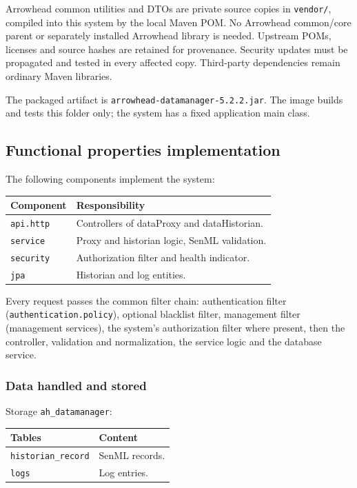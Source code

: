 \documentclass[a4paper]{arrowhead}
\begin{document}
Arrowhead common utilities and DTOs are private source copies in \texttt{vendor/}, compiled into this system by the local Maven POM. No Arrowhead common/core parent or separately installed Arrowhead library is needed. Upstream POMs, licenses and source hashes are retained for provenance. Security updates must be propagated and tested in every affected copy. Third-party dependencies remain ordinary Maven libraries.

The packaged artifact is \texttt{arrowhead-\allowbreak{}datamanager-5.2.2.jar}. The image builds and tests this folder only; the system has a fixed application main class.

\subsection{Functional properties implementation}

The following components implement the system:

\noindent\begin{longtable}{| p{5.6cm} | p{9.6cm} |} \hline
\rowcolor{gray!33} Component & Responsibility \\ \hline \endhead
\texttt{api.\allowbreak{}http} & Controllers of dataProxy and dataHistorian. \\ \hline
\texttt{service} & Proxy and historian logic, SenML validation. \\ \hline
\texttt{security} & Authorization filter and health indicator. \\ \hline
\texttt{jpa} & Historian and log entities. \\ \hline
\end{longtable}

Every request passes the common filter chain: authentication filter (\texttt{authentication.\allowbreak{}policy}), optional blacklist filter, management filter (management services), the system's authorization filter where present, then the controller, validation and normalization, the service logic and the database service.

\subsubsection{Data handled and stored}

Storage \texttt{ah\_\allowbreak{}datamanager}:

\noindent\begin{longtable}{| p{6.4cm} | p{8.8cm} |} \hline
\rowcolor{gray!33} Tables & Content \\ \hline \endhead
\texttt{historian\_\allowbreak{}record} & SenML records. \\ \hline
\texttt{logs} & Log entries. \\ \hline
\end{longtable}
\end{document}
